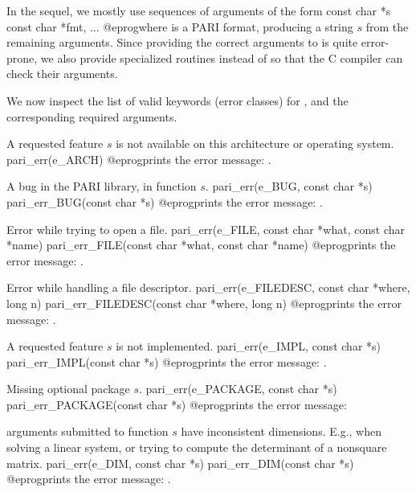 \noindent In the sequel, we mostly use sequences of arguments of the form
\bprog
  const char *s
  const char *fmt, ...
@eprog\noindent where  is a PARI
format, producing a string $s$ from the remaining arguments. Since
providing the correct arguments to  is quite error-prone, we
also provide specialized routines 
instead of  so that the C compiler
can check their arguments.

\noindent We now inspect the list of valid keywords (error classes) for
, and the corresponding required arguments.


 A requested feature $s$ is not available on this
architecture or operating system.
\bprog
  pari_err(e_ARCH)
@eprog\noindent prints the error message: .

 A bug in the PARI library, in function $s$.
\bprog
  pari_err(e_BUG, const char *s)
  pari_err_BUG(const char *s)
@eprog\noindent prints the error message: .

 Error while trying to open a file.
\bprog
  pari_err(e_FILE, const char *what, const char *name)
  pari_err_FILE(const char *what, const char *name)
@eprog\noindent prints the error message: .

 Error while handling a file descriptor.
\bprog
  pari_err(e_FILEDESC, const char *where, long n)
  pari_err_FILEDESC(const char *where, long n)
@eprog\noindent prints the error message: .

 A requested feature $s$ is not implemented.
\bprog
  pari_err(e_IMPL, const char *s)
  pari_err_IMPL(const char *s)
@eprog\noindent prints the error message: .

 Missing optional package $s$.
\bprog
  pari_err(e_PACKAGE, const char *s)
  pari_err_PACKAGE(const char *s)
@eprog\noindent prints the error message: 


 arguments submitted to function $s$ have inconsistent
dimensions. E.g., when solving a linear system, or trying to compute the
determinant of a nonsquare matrix.
\bprog
  pari_err(e_DIM, const char *s)
  pari_err_DIM(const char *s)
@eprog\noindent prints the error message: .

